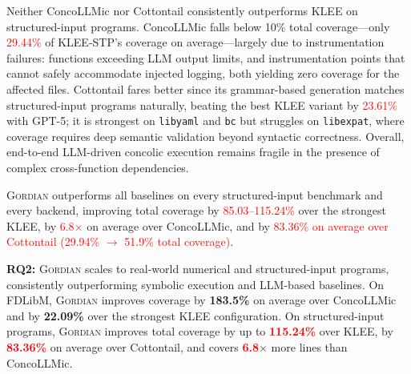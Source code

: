 \documentclass[acmsmall,screen,nonacm]{acmart}
\newcommand{\rev}[1]{\textcolor{red}{#1}}
\newcommand{\rev}[1]{#1}
\newcommand{\projName}{\textsc{Gordian}\xspace}
\theoremstyle{definition}
\begin{document}
Neither ConcoLLMic nor Cottontail consistently outperforms KLEE on structured-input programs. ConcoLLMic falls below 10\% total coverage---only \rev{29.44\%} of KLEE-STP's coverage on average---largely due to instrumentation failures: functions exceeding LLM output limits, and instrumentation points that cannot safely accommodate injected logging, both yielding zero coverage for the affected files. Cottontail fares better since its grammar-based generation matches structured-input programs naturally, beating the best KLEE variant by \rev{23.61\%} with GPT-5; it is strongest on \texttt{libyaml} and \texttt{bc} but struggles on \texttt{libexpat}, where coverage requires deep semantic validation beyond syntactic correctness. Overall, end-to-end LLM-driven concolic execution remains fragile in the presence of complex cross-function dependencies.

\projName{} outperforms all baselines on every structured-input benchmark and every backend, improving total coverage by \rev{85.03--115.24\%} over the strongest KLEE, by \rev{6.8$\times$} on average over ConcoLLMic, and by \rev{83.36\% on average over Cottontail (29.94\% $\to$ 51.9\% total coverage)}.

\begin{tcolorbox}[colback=gray!5, colframe=black!20, arc=2pt, boxrule=0.3mm, breakable, sharp corners, left=2pt, right=2pt, top=2pt, bottom=2pt]
\textbf{RQ2:} \projName{} scales  to real-world numerical and structured-input programs, consistently outperforming symbolic execution and LLM-based baselines.
On FDLibM, \projName{} improves coverage by \textbf{183.5\%} on average over ConcoLLMic and by \textbf{22.09\%} over the strongest KLEE configuration.
On structured-input programs, \projName{} improves total coverage by up to \textbf{\rev{115.24\%}} over KLEE, by \textbf{\rev{83.36\%}} on average over Cottontail, and covers \textbf{\rev{6.8}$\times$} more lines than ConcoLLMic.
\end{tcolorbox}
\end{document}
